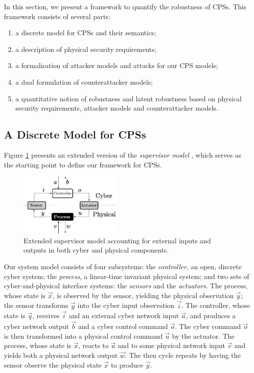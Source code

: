 In this section, we present a framework to quantify the robustness of CPSs. This framework consists of several parts:
\begin{enumerate}
  \item a discrete model for CPSs and their semantics; 
  \item a description of physical security requirements;
  \item a formalisation of attacker models and attacks for our CPS models;
  \item a dual formulation of counterattacker models;
  \item a quantitative notion of robustness and latent robustness based on physical security requirements, attacker models and counterattacker models.
\end{enumerate}

\subsection{A Discrete Model for CPSs}
Figure \ref{fig:IFCPS} presents an extended version of the \emph{supervisor model} \cite{doi:10.1137/0325013}, which serves as the starting point to define our framework for CPSs. 
\begin{figure}
\centering
\includegraphics[width=0.45\textwidth]{Figures/IFCPS}
\caption{Extended supervisor model accounting for external inputs and outputs in both cyber and physical components.}
\label{fig:IFCPS}
\end{figure}
Our system model consists of four subsystems: the \emph{controller}, an open, discrete cyber system; the \emph{process}, a linear-time invariant physical system; and two sets of cyber-and-physical interface systems: the \emph{sensors} and the \emph{actuators}. The process, whose state is $\vec{x}$, is observed by the sensor, yielding the physical observation $\vec{y}$; the sensor transforms $\vec{y}$ into the cyber input observation $\vec{i}$. The controller, whose state is $\vec{q}$, receives $\vec{i}$ and an external cyber network input $\vec{a}$, and produces a cyber network output $\vec{b}$ and a cyber control command $\vec{o}$. The cyber command $\vec{o}$ is then transformed into a physical control command $\vec{u}$ by the actuator. The process, whose state is $\vec{x}$, reacts to $\vec{u}$ and to some physical network input $\vec{v}$ and yields both a physical network output $\vec{w}$. The then cycle repeats by having the sensor observe the physical state $\vec{x}$ to produce $\vec{y}$. 


